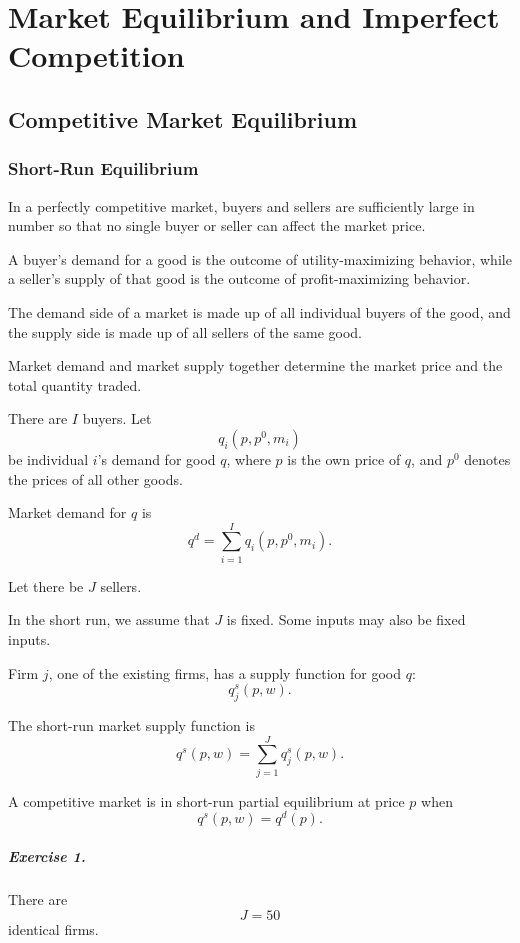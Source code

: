 \chapter{Market Equilibrium and Imperfect Competition}

\section{Competitive Market Equilibrium}

\subsection{Short-Run Equilibrium}

In a perfectly competitive market, buyers and sellers are sufficiently large in number so that no single buyer or seller can affect the market price.

A buyer's demand for a good is the outcome of utility-maximizing behavior, while a seller's supply of that good is the outcome of profit-maximizing behavior.

The demand side of a market is made up of all individual buyers of the good, and the supply side is made up of all sellers of the same good.

Market demand and market supply together determine the market price and the total quantity traded.

There are \(I\) buyers. Let
\[
q_i(p,p^0,m_i)
\]
be individual \(i\)'s demand for good \(q\), where \(p\) is the own price of \(q\), and \(p^0\) denotes the prices of all other goods.

Market demand for \(q\) is
\[
q^d
=
\sum_{i=1}^I q_i(p,p^0,m_i).
\]

Let there be \(J\) sellers.

In the short run, we assume that \(J\) is fixed. Some inputs may also be fixed inputs.

Firm \(j\), one of the existing firms, has a supply function for good \(q\):
\[
q_j^s(p,w).
\]

The short-run market supply function is
\[
q^s(p,w)
=
\sum_{j=1}^J q_j^s(p,w).
\]

A competitive market is in short-run partial equilibrium at price \(p\) when
\[
q^s(p,w)
=
q^d(p).
\]

\paragraph{Exercise 1.}
There are
\[
J=50
\]
identical firms.

